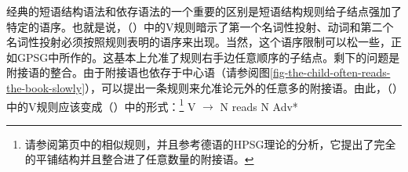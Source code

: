 经典的短语结构语法和依存语法的一个重要的区别是短语结构规则给子结点强加了特定的语序。也就是说，（）中的V规则暗示了第一个名词性投射、动词和第二个名词性投射必须按照规则表明的语序来出现。当然，这个语序限制可以松一些，正如GPSG中所作的。这基本上允准了规则右手边任意顺序的子结点。剩下的问题是附接语的整合。由于附接语也依存于中心语（请参阅图\vref{fig-the-child-often-reads-the-book-slowly}），可以提出一条规则来允准论元外的任意多的附接语。由此，（）中的V规则应该变成（）中的形式：\footnote{
请参阅第\pageref{adv-metarule}页中\gpsgc 的相似规则，并且参考德语的HPSG理论的分析\citet{Kasper94a}，它提出了完全的平铺结构并且整合进了任意数量的附接语。
}
\ea
V $\to$ N reads N Adv*
\z 

